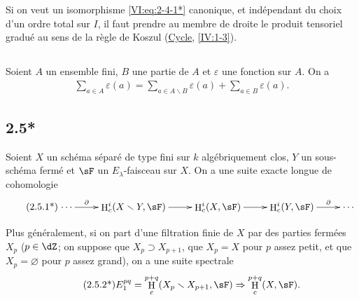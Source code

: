 \documentclass[oneside]{book}
\DeclareMathOperator{\h}{H}
\renewcommand{\setminus}{\smallsetminus}
\theoremstyle{sga-source}
\theoremstyle{sga-source-dash}
\theoremstyle{sga-source-dotdash}
\theoremstyle{sga-source-number-note-dash}
\theoremstyle{sga-source-note-number-dotdash}
\theoremstyle{sga-source-example-dotdash}
\theoremstyle{sga-source-inline-number}
\theoremstyle{sga-source-bare-number}
\theoremstyle{sga-source}
\newcommand{\PrintPage}[1]{}\newcommand{\MathPage}[1]{}\newcommand{\PrintCite}[2]{#1}\newcommand{\var}[3]{#1}
\begin{document}
Si on veut un isomorphisme \eqref{VI:eq:2-4-1*} canonique, et indépendant du 
choix d'un ordre total sur $I$, il faut prendre au membre de droite le produit 
tensoriel gradué au sens de la règle de Koszul 
(\hyperref[IV]{Cycle}, \ref{IV:1-3}). 





\subsection{}\label{VI:2-5}

Soient $A$ un ensemble fini, $B$ une partie de $A$ et $\varepsilon$ une 
fonction sur $A$. On a 
\begin{align*}\tag{2.5.1}\label{VI:2-5-1}
  \sum_{a\in A} \varepsilon(a) = \sum_{a\in A\setminus B}\varepsilon(a) + \sum_{a\in B} \varepsilon(a) \text{.}
\end{align*}





\subsection*{2.5*}\label{VI:2-5*}

Soient $X$ un schéma séparé de type fini sur $k$ algébriquement clos, 
$Y$ un sous-schéma fermé et $\sF$ un $E_\lambda$-faisceau sur $X$. On a 
une suite exacte longue de cohomologie 
\begin{align*}\tag{2.5.1*}\label{VI:eq:2-5-1*}
\xymatrix{
  \cdots \ar[r]^-\partial 
    & \h_c^i(X\setminus Y,\sF) \ar[r] 
    & \h_c^i(X,\sF) \ar[r] 
    & \h_c^i(Y,\sF) \ar[r]^-\partial 
    & \cdots 
}
\end{align*}

\PrintPage{186}
Plus généralement, si on part d'une filtration finie de $X$ par des parties 
fermées $X_p$ ($p\in \dZ$; on suppose que $X_p\supset X_{p+1}$, que $X_p=X$ 
pour $p$ assez petit, et que $X_p=\varnothing$ pour $p$ assez grand), on a une 
suite spectrale 
\begin{align*}\tag{2.5.2*}\label{VI:eq:2-5-2*}
  E_1^{p q} = \h_c^{p+q}(X_p\setminus X_{p+1},\sF) \Rightarrow \h_c^{p+q}(X,\sF) \text{.}
\end{align*}





\subsection{}\label{VI:2-6}
\end{document}
